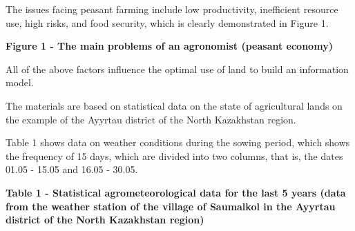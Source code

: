 The issues facing peasant farming include low productivity, inefficient
resource use, high risks, and food security, which is clearly
demonstrated in Figure 1.

\textbf{Figure 1 - The main problems of an agronomist (peasant economy)}

All of the above factors influence the optimal use of land to build an
information model.

The materials are based on statistical data on the state of agricultural
lands on the example of the Ayyrtau district of the North Kazakhstan
region.

Table 1 shows data on weather conditions during the sowing period, which
shows the frequency of 15 days, which are divided into two columns, that
is, the dates 01.05 - 15.05 and 16.05 - 30.05.

\textbf{Table 1 - Statistical agrometeorological data for the last 5
years (data from the weather station of the village of Saumalkol in the
Ayyrtau district of the North Kazakhstan region)}

